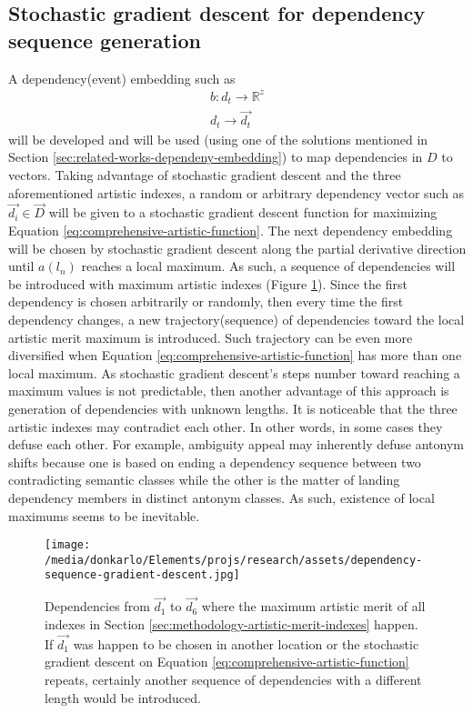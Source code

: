 \documentclass{article}
\begin{document}
	\subsection{Stochastic gradient descent for dependency sequence generation}\label{sec:methodology-stochastic-gradient-descent} A dependency(event) embedding such as 
	\begin{equation}
	\begin{split}
	b:d_t\longrightarrow \mathbb{R}^z
	\\
	d_t\longrightarrow\vec{d_t}
	\end{split}
	\label{eq:script-embedding-function}
	\end{equation} 
	will be developed and will be used (using one of the solutions mentioned in Section \ref{sec:related-works-dependeny-embedding}) to map dependencies in $D$ to vectors. Taking advantage of stochastic gradient descent and the three aforementioned artistic indexes, a random or arbitrary dependency vector such as $\vec{d_i} \in \vec{D}$ will be given to a stochastic gradient descent function for maximizing Equation \ref{eq:comprehensive-artistic-function}. The next dependency embedding will be chosen by stochastic gradient descent along the partial derivative direction until $a(l_n)$ reaches a local maximum. As such, a sequence of dependencies will be introduced with maximum artistic indexes (Figure \ref{fig:dependency-gradient-descent}). Since the first dependency is chosen arbitrarily or randomly, then every time the first dependency changes, a new trajectory(sequence) of dependencies toward the local artistic merit maximum is introduced. Such trajectory can be even more diversified when Equation \ref{eq:comprehensive-artistic-function} has more than one local maximum. As stochastic gradient descent's steps number toward reaching a maximum values is not predictable, then another advantage of this approach is generation of dependencies with unknown lengths.
	It is noticeable that the three artistic indexes may contradict each other. In other words, in some cases they defuse each other. For example, ambiguity appeal may inherently defuse antonym shifts because one is based on ending a dependency sequence between two contradicting semantic classes while the other is the matter of landing dependency members in distinct antonym classes. As such, existence of local maximums seems to be inevitable.      
	\begin{figure}[h!]
		\centering
		\texttt{[image: /media/donkarlo/Elements/projs/research/assets/dependency-sequence-gradient-descent.jpg]}
		\caption{Dependencies from $\vec{d_1}$ to $\vec{d_6}$ where the maximum artistic merit of all indexes in Section \ref{sec:methodology-artistic-merit-indexes} happen. If $\vec{d_1}$ was happen to be chosen in another location or the stochastic gradient descent on Equation \ref{eq:comprehensive-artistic-function} repeats, certainly another sequence of dependencies with a different length would be introduced.} 
		\label{fig:dependency-gradient-descent}
	\end{figure}	
\end{document}

